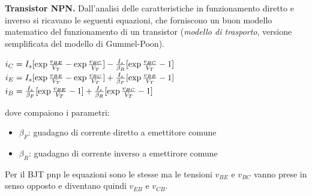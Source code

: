 \documentclass[a4paper,portrait,12pt]{article}
\theoremstyle{definition}
\begin{document}
\textbf{Transistor NPN.} Dall'analisi delle caratteristiche in funzionamento diretto e inverso si ricavano
le seguenti equazioni, che forniscono un buon modello matematico del funzionamento di un transistor
(\textit{modello di trasporto}, versione semplificata del modello di Gummel-Poon).
\begin{center}
$i_C=I_s[\exp{{v_{BE} \over V_T}}-\exp{{v_{BC} \over V_T}}]-{I_s \over \beta_R}[\exp{{v_{BC} \over V_T}}-1]$\\
$i_E=I_s[\exp{{v_{BE} \over V_T}}-\exp{{v_{BC} \over V_T}}]+{I_s \over \beta_F}[\exp{{v_{BE} \over V_T}}-1]$\\
$i_B={I_s \over \beta_F}[\exp{{v_{BE} \over V_T}-1}]+{I_s \over \beta_R}[\exp{{v_{BC} \over V_T}}-1]$
\end{center}
dove compaiono i parametri:
\begin{itemize}
\item $\beta_F$: guadagno di corrente diretto a emettitore comune
\item $\beta_R$: guadagno di corrente inverso a emettirore comune 
\end{itemize}
Per il BJT pnp le equazioni sono le stesse ma le tensioni $v_{BE}$ e $v_{BC}$ vanno prese in senso
opposto e diventano quindi $v_{EB}$ e $v_{CB}$.
\bigskip
\end{document}
